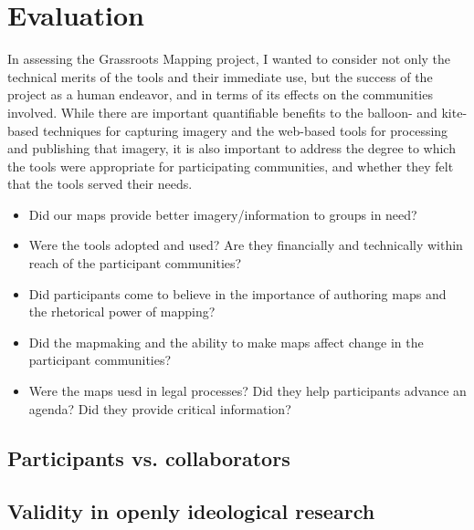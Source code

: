 \documentclass[11pt]{report}
\begin{document}
\chapter{Evaluation}

In assessing the Grassroots Mapping project, I wanted to consider not only the technical merits of the tools and their immediate use, but the success of the project as a human endeavor, and in terms of its effects on the communities involved. While there are important quantifiable benefits to the balloon- and kite-based techniques for capturing imagery and the web-based tools for processing and publishing that imagery, it is also important to address the degree to which the tools were appropriate for participating communities, and whether they felt that the tools served their needs. 

\begin{itemize}
\item Did our maps provide better imagery/information to groups in need?
\item Were the tools adopted and used? Are they financially and technically within reach of the participant communities? 
\item Did participants come to believe in the importance of authoring maps and the rhetorical power of mapping?
\item Did the mapmaking and the ability to make maps affect change in the participant communities?
\item Were the maps uesd in legal processes? Did they help participants advance an agenda? Did they provide critical information?
\end{itemize}

\section{Participants vs. collaborators}


\section{Validity in openly ideological research}
\label{sec:lather}
\end{document}
